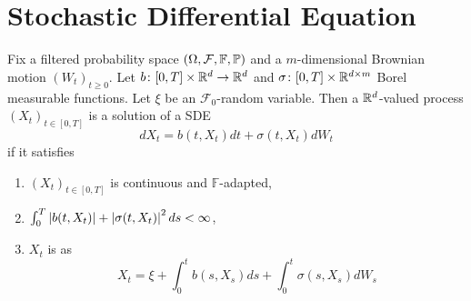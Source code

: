 \documentclass[a4paper,12pt]{article}
\begin{document}
\section{Stochastic Differential Equation}
Fix a filtered probability space $(\Omega,\mathcal{F}, \mathbb{F},\mathbb{P})$ and a $m$-dimensional Brownian motion $(W_t)_{t \geqslant 0}$. Let $b \colon [0,T]\times \mathbb{R}^d \rightarrow \mathbb{R}^d$ and $\sigma \colon [0,T]\times \mathbb{R}^{d \times m}$ Borel measurable functions. Let $\xi$ be an $\mathcal{F}_0$-random variable. Then a $\mathbb{R}^d$-valued process $(X_t)_{t \in [0,T]}$ is a solution of a SDE
\begin{equation*}
  dX_t = b(t,X_t)dt + \sigma(t,X_t)dW_t
\end{equation*}
if it satisfies
\begin{enumerate}[label=(\roman*)]
\item $(X_t)_{t \in [0,T]}$ is continuous and $\mathbb{F}$-adapted,
\item $\int_0^T \left\lvert b(t,X_t)\right\lvert + \left\lvert\sigma(t,X_t)\right\lvert^2 ds < \infty$,
\item $X_t$ is as
\begin{equation*}
  X_t = \xi + \int_0^t b(s,X_s)ds + \int_0^t\sigma(s,X_s)dW_s
\end{equation*}
\end{enumerate}
\end{document}
